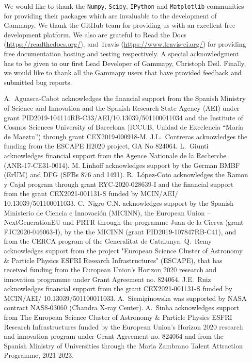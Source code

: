 \documentclass[longauth]{aa}
\newcommand{\ReadthedocsUrl}{\url{https://readthedocs.org/}\xspace}
\newcommand{\TravisUrl}{\url{https://www.travis-ci.org/}\xspace}
\newcommand{\gammapy}{Gammapy\xspace}
\newcommand{\github}{GitHub\xspace}
\begin{document}
\begin{acknowledgements}

        We would like to thank the \texttt{Numpy}, \texttt{Scipy}, \texttt{IPython} and
        \texttt{Matplotlib} communities for providing their packages which are
        invaluable to the development of \gammapy. We thank the \github team for
        providing us with an excellent free development platform. We also are grateful
        to Read the Docs (\ReadthedocsUrl), and Travis (\TravisUrl) for providing free
        documentation hosting and testing respectively. A special acknowledgment has to be given
        to our first Lead Developer of \gammapy, Christoph Deil. Finally, we would like to thank
        all the \gammapy users that have provided feedback and submitted bug reports.

        A.~Aguasca-Cabot acknowledges the financial support from the Spanish Ministry of Science and Innovation
        and the Spanish Research State Agency (AEI) under grant PID2019-104114RB-C33/AEI/10.13039/501100011034
        and the Institute of Cosmos Sciences University of Barcelona (ICCUB, Unidad de Excelencia “María de Maeztu”)
        through grant CEX2019-000918-M. J.L.~Contreras acknowledges the funding from the ESCAPE H2020 project, GA No 824064.
        L.~Giunti acknowledges financial support from the Agence Nationale de la Recherche (ANR-17-CE31-0014). M. Linhoff
        acknowledges support by the German BMBF (ErUM) and DFG (SFBs 876 and 1491).
        R.~López-Coto acknowledges the Ramon y Cajal program through grant RYC-2020-028639-I and the financial support
        from the grant CEX2021-001131-S funded by MCIN/AEI/ 10.13039/501100011033. C.~Nigro C.N. acknowledges support by
        the Spanish Ministerio de Ciencia e Innovación (MICINN), the European Union – NextGenerationEU and PRTR  through
        the programme Juan de la Cierva (grant FJC2020-046063-I), by the the MICINN (grant PID2019-107847RB-C41), and from
        the CERCA program of the Generalitat de Catalunya. Q.~Remy acknowledges support from the project "European Science
        Cluster of Astronomy \& Particle Physics ESFRI Research Infrastructures" (ESCAPE), that has received funding from
        the European Union’s Horizon 2020 research and innovation programme under Grant Agreement no. 824064. J.E.~Ruiz
        acknowledges financial support from the grant
        CEX2021-001131-S funded by MCIN/AEI/ 10.13039/501100011033. A.~Siemiginowska was supported by NASA contract
        NAS8-03060 (Chandra X-ray Center). A.~Sinha acknowledges support from The European Science Cluster of Astronomy \&
        Particle Physics ESFRI Research Infrastructures  funded by the European Union’s Horizon 2020 research and
        innovation program under Grant Agreement no. 824064 and from the Spanish Ministry of Universities through the
        Maria Zambrano Talent Attraction Programme, 2021-2023.

\end{acknowledgements}
\end{document}
